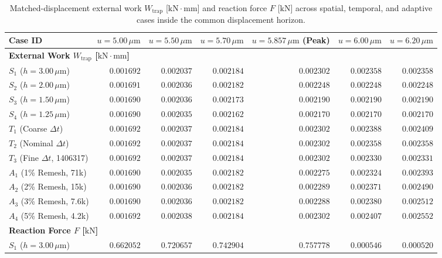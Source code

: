 \begin{table}[htbp]
\centering
\caption{Matched-displacement external work $W_{\mathrm{trap}}$ [$\mathrm{kN\cdot mm}$] and reaction force $F$ [$\mathrm{kN}$] across spatial, temporal, and adaptive cases inside the common displacement horizon.}
\label{tab:matched_work_force}
\scriptsize
\setlength{\tabcolsep}{3pt}
\begin{tabularx}{\textwidth}{lrrrrrr}
\toprule
Case ID & $u=5.00\,\mu\mathrm{m}$ & $u=5.50\,\mu\mathrm{m}$ & $u=5.70\,\mu\mathrm{m}$ & $u=5.857\,\mu\mathrm{m}$ (Peak) & $u=6.00\,\mu\mathrm{m}$ & $u=6.20\,\mu\mathrm{m}$ \\
\midrule
\multicolumn{7}{l}{\textbf{External Work $W_{\mathrm{trap}}$ [$\mathrm{kN\cdot mm}$]}} \\
$S_1$ ($h=3.00\,\mu\mathrm{m}$) & $0.001692$ & $0.002037$ & $0.002184$ & $0.002302$ & $0.002358$ & $0.002358$ \\
$S_2$ ($h=2.00\,\mu\mathrm{m}$) & $0.001691$ & $0.002036$ & $0.002182$ & $0.002248$ & $0.002248$ & $0.002248$ \\
$S_3$ ($h=1.50\,\mu\mathrm{m}$) & $0.001690$ & $0.002036$ & $0.002173$ & $0.002190$ & $0.002190$ & $0.002190$ \\
$S_4$ ($h=1.25\,\mu\mathrm{m}$) & $0.001690$ & $0.002035$ & $0.002162$ & $0.002170$ & $0.002170$ & $0.002170$ \\
$T_1$ (Coarse $\Delta t$) & $0.001692$ & $0.002037$ & $0.002184$ & $0.002302$ & $0.002388$ & $0.002409$ \\
$T_2$ (Nominal $\Delta t$) & $0.001692$ & $0.002037$ & $0.002184$ & $0.002302$ & $0.002358$ & $0.002358$ \\
$T_3$ (Fine $\Delta t$, 1406317) & $0.001692$ & $0.002037$ & $0.002184$ & $0.002302$ & $0.002330$ & $0.002331$ \\
$A_1$ (1\% Remesh, 71k) & $0.001690$ & $0.002035$ & $0.002182$ & $0.002275$ & $0.002324$ & $0.002393$ \\
$A_2$ (2\% Remesh, 15k) & $0.001690$ & $0.002036$ & $0.002182$ & $0.002289$ & $0.002371$ & $0.002490$ \\
$A_3$ (3\% Remesh, 7.6k) & $0.001690$ & $0.002036$ & $0.002182$ & $0.002288$ & $0.002380$ & $0.002512$ \\
$A_4$ (5\% Remesh, 4.2k) & $0.001692$ & $0.002038$ & $0.002184$ & $0.002302$ & $0.002407$ & $0.002552$ \\
\midrule
\multicolumn{7}{l}{\textbf{Reaction Force $F$ [$\mathrm{kN}$]}} \\
$S_1$ ($h=3.00\,\mu\mathrm{m}$) & $0.662052$ & $0.720657$ & $0.742904$ & $0.757778$ & $0.000546$ & $0.000520$ \\

\end{tabularx}
\end{table}
